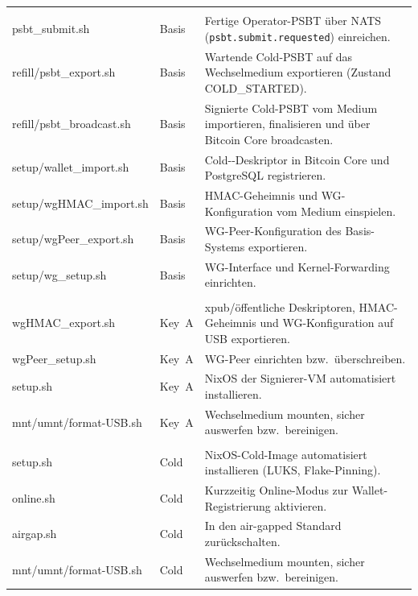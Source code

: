 \begin{xltabular}{\linewidth}{@{} >{\ttfamily\RaggedRight}p{4.2cm} l >{\RaggedRight}X @{}}
\\
psbt\_submit.sh                 & Basis & Fertige Operator-\ac{PSBT} über \ac{NATS} (\texttt{psbt.submit.requested}) einreichen. \\
refill\slash psbt\_export.sh    & Basis & Wartende Cold-\ac{PSBT} auf das Wechselmedium exportieren (Zustand COLD\_STARTED). \\
refill\slash psbt\_broadcast.sh & Basis & Signierte Cold-\ac{PSBT} vom Medium importieren, finalisieren und über Bitcoin Core broadcasten. \\
setup\slash wallet\_import.sh   & Basis & Cold--Deskriptor in Bitcoin Core und PostgreSQL registrieren. \\
setup\slash wgHMAC\_import.sh   & Basis & \ac{HMAC}-Geheimnis und \ac{WG}-Konfiguration vom Medium einspielen. \\
setup\slash wgPeer\_export.sh   & Basis & \ac{WG}-Peer-Konfiguration des Basis-Systems exportieren. \\
setup\slash wg\_setup.sh        & Basis & \ac{WG}-Interface und Kernel-Forwarding einrichten. \\
\midrule
\addlinespace
{}\\
\addlinespace
wgHMAC\_export.sh & Key~A & \ac{xpub}/öffentliche Deskriptoren, \ac{HMAC}-Geheimnis und \ac{WG}-Konfiguration auf \ac{USB} exportieren. \\
wgPeer\_setup.sh  & Key~A & \ac{WG}-Peer einrichten bzw.\ überschreiben. \\
setup.sh          & Key~A & NixOS der Signierer-\ac{VM} automatisiert installieren. \\
mnt/umnt\slash format-USB.sh & Key~A & Wechselmedium mounten, sicher auswerfen bzw.\ bereinigen. \\
\addlinespace
{}\\
\addlinespace
setup.sh          & Cold & NixOS-Cold-Image automatisiert installieren (LUKS, Flake-Pinning). \\
online.sh         & Cold & Kurzzeitig Online-Modus zur Wallet-Registrierung aktivieren. \\
airgap.sh         & Cold & In den air-gapped Standard zurückschalten. \\
mnt/umnt\slash format-USB.sh & Cold & Wechselmedium mounten, sicher auswerfen bzw.\ bereinigen. \\

\end{xltabular}
